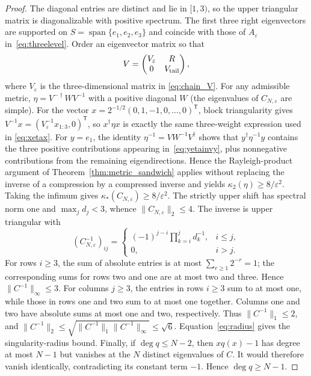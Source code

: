 \begin{proof}
The diagonal entries are distinct and lie in $[1,3)$, so the upper triangular
matrix is diagonalizable with positive spectrum. The first three right eigenvectors are supported on
$S=\operatorname{span}\{e_1,e_2,e_3\}$ and coincide with those of
$A_\varepsilon$ in~\eqref{eq:threelevel}.  Order an eigenvector matrix so that
\begin{equation}
 V=\begin{pmatrix}V_\varepsilon&R\\0&V_{\rm tail}\end{pmatrix},
\end{equation}
where $V_\varepsilon$ is the three-dimensional matrix in
\eqref{eq:chain_V}.  For any admissible metric,
$\eta=V^{-\dagger}WV^{-1}$ with a positive diagonal $W$ (the eigenvalues
of $C_{N,\varepsilon}$ are simple).  For the vector
$x=2^{-1/2}(0,1,-1,0,\ldots,0)^{\mathsf T}$, block triangularity gives
$V^{-1}x=(V_\varepsilon^{-1}x_{1:3},0)^{\mathsf T}$, so
$x^\dagger\eta x$ is exactly the same three-weight expression used in
\eqref{eq:xetax}.  For $y=e_1$, the identity
$\eta^{-1}=VW^{-1}V^\dagger$ shows that $y^\dagger\eta^{-1}y$ contains the
three positive contributions appearing in~\eqref{eq:yetainvy}, plus
nonnegative contributions from the remaining eigendirections.  Hence the
Rayleigh-product argument of Theorem~\ref{thm:metric_sandwich} applies
without replacing the inverse of a compression by a compressed inverse and yields
$\kappa_2(\eta)\geq8/\varepsilon^2$.  Taking the infimum gives
$\kappa_*(C_{N,\varepsilon})\geq8/\varepsilon^2$.
The strictly upper shift has spectral norm one and $\max_jd_j<3$,
whence $\|C_{N,\varepsilon}\|_2\leq4$.
The inverse is upper triangular with
\begin{equation}\label{eq:growinginverse}
 (C_{N,\varepsilon}^{-1})_{ij}=
 \begin{cases}(-1)^{j-i}\displaystyle\prod_{k=i}^{j}d_k^{-1},&i\leq j,\\
 0,&i>j.\end{cases}
\end{equation}
For rows $i\geq3$, the sum of absolute entries is at most
$\sum_{r\geq1}2^{-r}=1$; the corresponding sums for rows two and one
are at most two and three. Hence $\|C^{-1}\|_\infty\leq3$.
For columns $j\geq3$, the entries in rows $i\geq3$ sum to at most one,
while those in rows one and two sum to at most one together.
Columns one and two have absolute sums at most one and two, respectively.
Thus $\|C^{-1}\|_1\leq2$, and
$\|C^{-1}\|_2\leq\sqrt{\|C^{-1}\|_1\|C^{-1}\|_\infty}\leq\sqrt6$.
Equation~\eqref{eq:radius} gives the singularity-radius bound.
Finally, if $\deg q\leq N-2$, then $xq(x)-1$ has degree at most
$N-1$ but vanishes at the $N$ distinct eigenvalues of $C$.
It would therefore vanish identically, contradicting its constant
term $-1$. Hence $\deg q\geq N-1$.
\end{proof}
